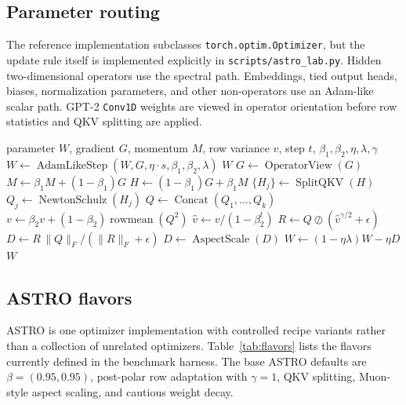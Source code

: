 \documentclass[10pt,twocolumn]{article}
\newcommand{\norm}[1]{\lVert #1 \rVert}
\begin{document}
\subsection{Parameter routing}

The reference implementation subclasses \texttt{torch.optim.Optimizer}, but the
update rule itself is implemented explicitly in \texttt{scripts/astro\_lab.py}.
Hidden two-dimensional operators use the spectral path. Embeddings, tied output
heads, biases, normalization parameters, and other non-operators use an
Adam-like scalar path. GPT-2 \texttt{Conv1D} weights are viewed in operator
orientation before row statistics and QKV splitting are applied.

\begin{algorithm}[t]
\caption{ASTRO-v2 update}
\label{alg:astro}
\footnotesize
\begin{algorithmic}[1]
\Require parameter $W$, gradient $G$, momentum $M$, row variance $v$, step $t$, $\beta_1,\beta_2,\eta,\lambda,\gamma$
  \State $W \gets \operatorname{AdamLikeStep}(W,G,\eta\cdot s,\beta_1,\beta_2,\lambda)$
  \State \Return $W$ 
\EndIf
\State $G \gets \operatorname{OperatorView}(G)$ 
\State $M \gets \beta_1 M + (1-\beta_1)G$
\State $H \gets (1-\beta_1)G + \beta_1 M$ 
\State $\{H_j\} \gets \operatorname{SplitQKV}(H)$ 
  \State $Q_j \gets \operatorname{NewtonSchulz}(H_j)$
\EndFor
\State $Q \gets \operatorname{Concat}(Q_1,\ldots,Q_k)$
\State $v \gets \beta_2 v + (1-\beta_2)\operatorname{rowmean}(Q^2)$
\State $\widehat v \gets v/(1-\beta_2^t)$
\State $R \gets Q \oslash (\widehat v^{\gamma/2}+\epsilon)$
\State $D \gets R\,\norm{Q}_F/(\norm{R}_F+\epsilon)$ 
\State $D \gets \operatorname{AspectScale}(D)$ 
\State $W \gets (1-\eta\lambda)W - \eta D$ 
\State \Return $W$
\end{algorithmic}
\end{algorithm}

\subsection{ASTRO flavors}

ASTRO is one optimizer implementation with controlled recipe variants rather
than a collection of unrelated optimizers. Table~\ref{tab:flavors} lists the
flavors currently defined in the benchmark harness. The base ASTRO defaults are
$\beta=(0.95,0.95)$, post-polar row adaptation with $\gamma=1$, QKV splitting,
Muon-style aspect scaling, and cautious weight decay.
\end{document}
